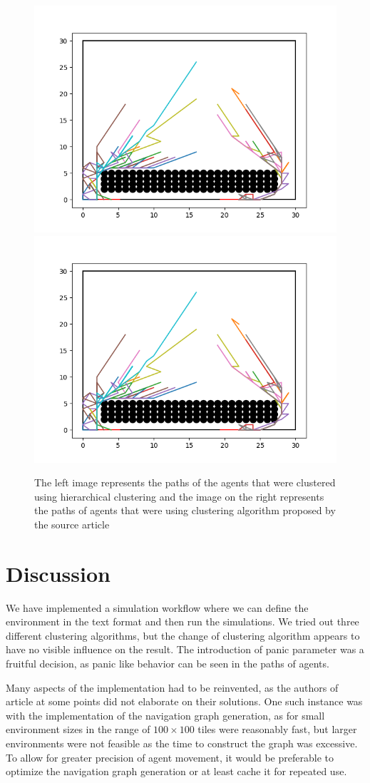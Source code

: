 \documentclass[9pt]{pnas-new}
\begin{document}
\begin{figure}[h!]
    \centering
    \includegraphics[width=0.45\linewidth]{fig/obst_nopanic_newclusters_path_plot.png}
\hfill
    \includegraphics[width=0.45\linewidth]{fig/obst_nopanic_oldclusters_path_plot.png}
    \caption{The left image represents the paths of the agents that were clustered using hierarchical clustering and the image on the right represents the paths of agents that were using clustering algorithm proposed by the source article}
    \label{fig:enter-label}
\end{figure}

\section{Discussion}
We have implemented a simulation workflow where we can define the environment in the text format and then run the simulations. We tried out three different clustering algorithms, but the change of clustering algorithm appears to have no visible influence on the result. The introduction of panic parameter was a fruitful decision, as panic like behavior can be seen in the paths of agents.

Many aspects of the implementation had to be reinvented, as the authors of article \cite{Wu_Huang_Tian_Yan_Yu_2024} at some points did not elaborate on their solutions. One such instance was with the implementation of the navigation graph generation, as for small environment sizes in the range of $100\times 100$ tiles were reasonably fast, but larger environments were not feasible as the time to construct the graph was excessive. To allow for greater precision of agent movement, it would be preferable to optimize the navigation graph generation or at least cache it for repeated use.
\end{document}
